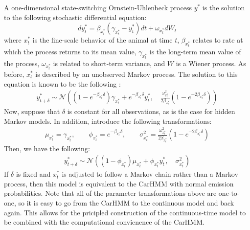 A one-dimensional state-switching Ornstein-Uhlenbeck process $y^*$ is the solution to the following stochastic differential equation:
%
$$dy^*_t = \beta_{x^*_t}(\gamma_{x^*_t} - y^*_t)dt + \omega_{x^*_t} dW_t$$
%
where $x^*_t$ is the fine-scale behavior of the animal at time $t$, $\beta_{x^*_t}$ relates to rate at which the process returns to its mean value, $\gamma_{x^*_t}$ is the long-term mean value of the process, $\omega_{x^*_t}$ is related to short-term variance, and $W$ is a Wiener process. As before, $x^*_t$ is described by an unobserved Markov process. The solution to this equation is known to be the following \cite{Michelot:2019}:
\begin{align*}
y^*_{t+\delta} \sim \mathcal{N}\left((1-e^{-\beta_{x^*_t}\delta})\gamma_{x^*_t} + e^{-\beta_{x^*_t}\delta} y^*_t,\quad \frac{\omega_{x^*_t}^2}{2\beta_{x^*_t}} (1-e^{-2\beta_{x^*_t}\delta})\right)
\end{align*}
Now, suppose that $\delta$ is constant for all observations, as is the case for hidden Markov models. In addition, introduce the following transformations:
\begin{align*}
\mu_{x^*_t} = \gamma_{x^*_t}, \qquad \phi_{x^*_t} = e^{-\beta_{x^*_t}\delta}, \qquad \sigma^2_{x^*_t} = \frac{\omega_{x^*_t}^2}{2\beta_{x^*_t}} (1-e^{-2\beta_{x^*_t}\delta})
\end{align*}
Then, we have the following:
\begin{align*}
y^*_{t+\delta} \sim \mathcal{N}\left((1-\phi_{x^*_t})\mu_{x^*_t} + \phi_{x^*_t} y^*_t,\quad \sigma_{x^*_t}^2 \right)
\end{align*}
%
If $\delta$ is fixed and $x^*_t$ is adjusted to follow a Markov chain rather than a Markov process, then this model is equivalent to the CarHMM with normal emission probabilities. Note that all of the parameter transformations above are one-to-one, so it is easy to go from the CarHMM to the continuous model and back again. This allows for the pricipled construction of the continuous-time model to be combined with the computational convienence of the CarHMM.



